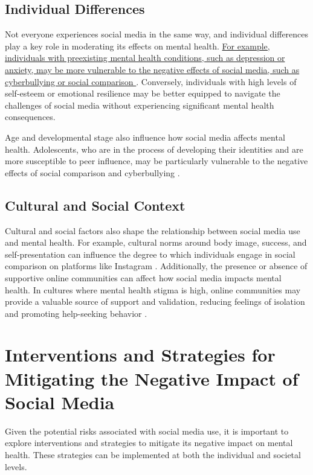 \documentclass[12pt]{article}
\begin{document}
\subsection{Individual Differences}

Not everyone experiences social media in the same way, and individual differences play a key role in moderating its effects on mental health. \ul{For example, individuals with preexisting mental health conditions, such as depression or anxiety, may be more vulnerable to the negative effects of social media, such as cyberbullying or social comparison }\cite{hampton2014}. Conversely, individuals with high levels of self-esteem or emotional resilience may be better equipped to navigate the challenges of social media without experiencing significant mental health consequences.

Age and developmental stage also influence how social media affects mental health. Adolescents, who are in the process of developing their identities and are more susceptible to peer influence, may be particularly vulnerable to the negative effects of social comparison and cyberbullying \cite{lenhart2015}.

\subsection{Cultural and Social Context}

Cultural and social factors also shape the relationship between social media use and mental health. For example, cultural norms around body image, success, and self-presentation can influence the degree to which individuals engage in social comparison on platforms like Instagram \cite{valkenburg2006}. Additionally, the presence or absence of supportive online communities can affect how social media impacts mental health. In cultures where mental health stigma is high, online communities may provide a valuable source of support and validation, reducing feelings of isolation and promoting help-seeking behavior \cite{valkenburg2006}.

\section{Interventions and Strategies for Mitigating the Negative Impact of Social Media}

Given the potential risks associated with social media use, it is important to explore interventions and strategies to mitigate its negative impact on mental health. These strategies can be implemented at both the individual and societal levels.
\end{document}
